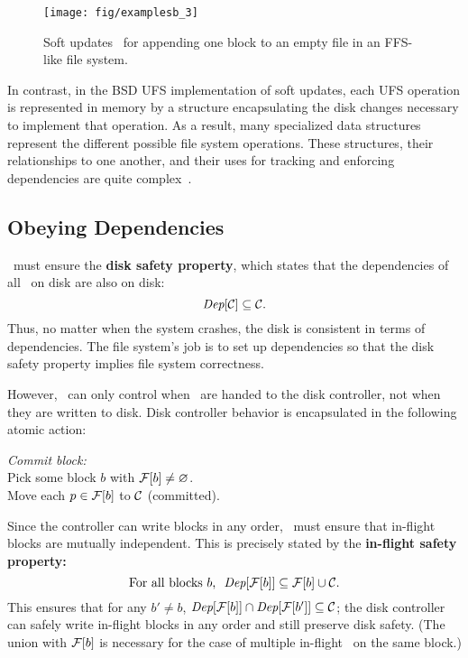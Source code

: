 \begin{figure}[htb]
  \centering
  \texttt{[image: fig/examplesb\_3]}
  \caption{\label{fig:softupdate} Soft updates \patches\
  for appending one block to an empty file in an FFS-like file system.}
\end{figure}

In contrast, in the BSD UFS implementation of soft updates, each UFS operation
is represented in memory by a structure encapsulating the disk changes necessary
to implement that operation. As a result, many specialized data structures
represent the different possible file system operations. These structures, their
relationships to one another, and their uses for tracking and enforcing
dependencies are quite complex~\cite{mckusick99soft}.


\subsection{Obeying Dependencies}
\label{sec:patch:dependencies}

\Kudos\ must ensure the \textbf{disk safety property}, which states that
 the dependencies of all \patches\ on disk are also on disk:
%
\[ \PDepset{\PDisk} \subseteq \PDisk. \]
%
Thus, no matter when the system crashes, the disk is consistent in terms of
dependencies.
%
The file system's job is to set up dependencies so that the disk safety
property implies file system correctness.

However, \Kudos\ can only control when \patches\ are handed to the disk
 controller, not when they are written to disk.
%
Disk controller behavior is encapsulated in the following atomic action:

\begin{tabbing}
\textit{Commit block:} \\
\quad Pick some block $b$ with $\PInf[b] \neq \emptyset$. \\
\quad Move each $p \in \PInf[b]$ to $\PDisk$ (committed).
\end{tabbing}

\noindent
%
Since the controller can write blocks in any order, \Kudos\ must ensure
that in-flight blocks are mutually independent.  This is precisely stated
by the \textbf{in-flight safety property:}
%
\[ \text{For all blocks $b$,~~} \PDepset{\PInf[b]} \subseteq \PInf[b] \cup \PDisk . \]
%
This ensures that for any $b' \neq b$, $\PDepset{\PInf[b]} \cap
 \PDepset{\PInf[b']} \subseteq \PDisk$; the disk controller can safely
 write in-flight blocks in any order and still preserve disk safety.
%
(The union with $\PInf[b]$ is necessary for the case of multiple in-flight
\patches\ on the same block.)


